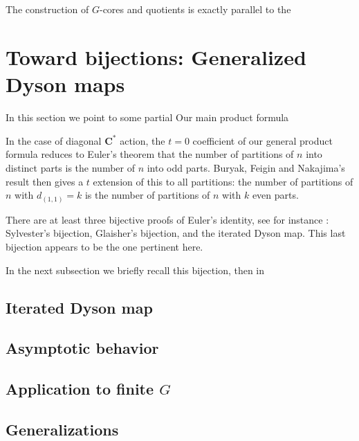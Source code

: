 \documentclass{amsart}[12pt]
\theoremstyle{definition}
\newcommand{\C}{\mathbf{C}}
\begin{document}
\subsection{ }

The construction of $G$-cores and quotients is exactly parallel to the 







\section{Toward bijections: Generalized Dyson maps} \label{sec:dyson}

In this section we point to some partial Our main product formula 

In the case of diagonal $\C^*$ action, the $t=0$ coefficient of our general product formula reduces to Euler's theorem that the number of partitions of $n$ into distinct parts is the number of $n$ into odd parts.  Buryak, Feigin and Nakajima's result then gives a $t$ extension of this to all partitions: the number of partitions of $n$ with $d_{(1,1)}=k$ is the number of partitions of $n$ with $k$ even parts.

There are at least three bijective proofs of Euler's identity, see for instance \cite{pak}: Sylvester's bijection, Glaisher's bijection, and the iterated Dyson map.  This last bijection appears to be the one pertinent here.

In the next subsection we briefly recall this bijection, then in 
\subsection{Iterated Dyson map} \label{sec:review-dyson}


\subsection{Asymptotic behavior} \label{sec-asymptotic-dyson}

\subsection{Application to finite \texorpdfstring{$G$}{G}} 


\subsection{Generalizations} \label{sec:generalized-dyson}






\end{document}
